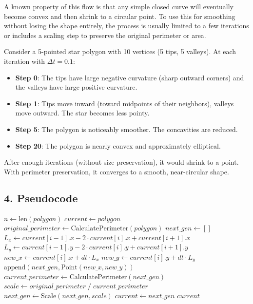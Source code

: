A known property of this flow is that any simple closed curve will eventually become convex and then shrink to a circular point. To use this for smoothing without losing the shape entirely, the process is usually limited to a few iterations or includes a scaling step to preserve the original perimeter or area.

\begin{example}\label{ex:mcf_star}
Consider a 5-pointed star polygon with 10 vertices (5 tips, 5 valleys). At each iteration with $\Delta t = 0.1$:
\begin{itemize}
    \item \textbf{Step 0}: The tips have large negative curvature (sharp outward corners) and the valleys have large positive curvature.
    \item \textbf{Step 1}: Tips move inward (toward midpoints of their neighbors), valleys move outward. The star becomes less pointy.
    \item \textbf{Step 5}: The polygon is noticeably smoother. The concavities are reduced.
    \item \textbf{Step 20}: The polygon is nearly convex and approximately elliptical.
\end{itemize}
After enough iterations (without size preservation), it would shrink to a point. With perimeter preservation, it converges to a smooth, near-circular shape.
\end{example}

\subsection{4. Pseudocode}

\begin{algorithm}
\caption{Mean Curvature Flow}
\label{alg:mean_curvature_flow}
\begin{algorithmic}[1]
    \State $n \gets \text{len}(polygon)$
    \State $current \gets polygon$
    \State $original\_perimeter \gets \text{CalculatePerimeter}(polygon)$
        \State $next\_gen \gets []$
            \State $L_x \gets current[i{-}1].x - 2 \cdot current[i].x + current[i{+}1].x$
            \State $L_y \gets current[i{-}1].y - 2 \cdot current[i].y + current[i{+}1].y$
            \State $new\_x \gets current[i].x + dt \cdot L_x$
            \State $new\_y \gets current[i].y + dt \cdot L_y$
            \State $\text{append}(next\_gen, \text{Point}(new\_x, new\_y))$
        \EndFor
            \State $current\_perimeter \gets \text{CalculatePerimeter}(next\_gen)$
            \State $scale \gets original\_perimeter \;/\; current\_perimeter$
            \State $next\_gen \gets \text{Scale}(next\_gen, scale)$
        \EndIf
        \State $current \gets next\_gen$
    \EndFor
    \State \Return $current$
\EndFunction
\end{algorithmic}
\end{algorithm}

